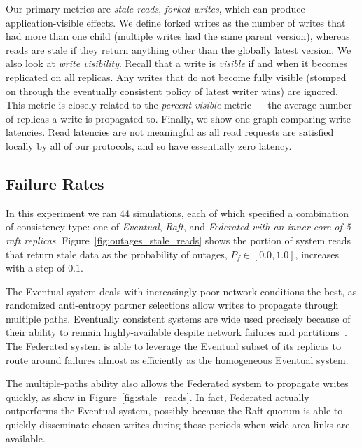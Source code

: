 \documentclass[10pt,conference,letterpaper]{IEEEtran}
\begin{document}
Our primary metrics are \textit{stale reads}, \textit{forked writes}, which can produce
application-visible effects.
We define forked writes as the number of writes that had more than one child (multiple
writes had the same parent version), whereas reads are stale if they return anything other
than the globally latest version.
We also look at \emph{write visibility}.
Recall that a write is \emph{visible} if and when it becomes replicated on all replicas.
Any writes that do not become fully visible (stomped on through the eventually consistent
policy of latest writer wins) are ignored.
This metric is closely related to the \textit{percent visible} metric --- the average
number of replicas a write is propagated to.
Finally, we show one graph comparing write latencies.
Read latencies are not meaningful as all read requests are satisfied locally by all of our
protocols, and so have essentially zero latency.

\subsection{Failure Rates}

In this experiment we ran 44 simulations, each of which specified a combination of
consistency type: one of \textit{Eventual}, \textit{Raft}, and
\textit{Federated with an inner core of 5 raft replicas}.
Figure~\ref{fig:outages_stale_reads} shows the portion of system reads that return stale
data as the probability of outages, $P_f \in [0.0,1.0]$, increases with a step of $0.1$.

The Eventual system deals with increasingly poor network conditions the best,
as randomized anti-entropy partner selections allow writes to propagate through multiple
paths.
Eventually consistent systems are wide used precisely because of their ability to remain
highly-available despite network failures and
partitions~\cite{bailis_bolt-causal_2013,bailis_probabilistically_2012,bailis_quantifying_2014}.
The Federated system is able to leverage the Eventual subset of its replicas to route
around failures almost as efficiently as the homogeneous Eventual system.

The multiple-paths ability also allows the Federated system to propagate writes quickly,
as show in Figure~\ref{fig:stale_reads}. In fact, Federated actually outperforms the
Eventual system, possibly because the Raft quorum is able to quickly disseminate chosen
writes during those periods when wide-area links are available.
\end{document}
